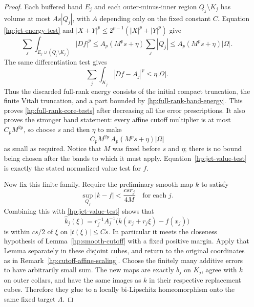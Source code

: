 \begin{proof}
Each buffered band $E_j$ and each outer-minus-inner region
$Q_j\setminus K_j$ has volume at most $A s|Q_j|$, with $A$ depending
only on the fixed constant $C$.  Equation
\eqref{hp:jet-energy-test} and
$|X+Y|^p\leq2^{p-1}(|X|^p+|Y|^p)$ give
\begin{equation}\label{hp:full-rank-band-energy}
 \sum_j\int_{E_j\cup(Q_j\setminus K_j)}|Df|^p
 \leq A_p(M^ps+\eta)\sum_j|Q_j|
 \leq A_p(M^ps+\eta)|\Omega|.
\end{equation}
The same differentiation test gives
\begin{equation}\label{hp:full-rank-core-error}
 \sum_j\int_{K_j}|Df-A_j|^p\leq\eta|\Omega|.
\end{equation}
Thus the discarded full-rank energy consists of the initial compact
truncation, the finite Vitali truncation, and a part bounded by
\eqref{hp:full-rank-band-energy}.  This proves
\eqref{hp:full-rank-core-tests} after decreasing all the error
prescriptions.  It also proves the stronger band statement: every
affine cutoff multiplier is at most $C_pM^{2p}$, so choose $s$ and
then $\eta$ to make
\[
 C_pM^{2p}\,A_p(M^ps+\eta)|\Omega|
\]
as small as required.  Notice that $M$ was fixed before $s$ and
$\eta$; there is no bound being chosen after the bands to which it
must apply.  Equation~\eqref{hp:jet-value-test} is exactly the
stated normalized value test for $f$.

Now fix this finite family.  Require the preliminary smooth map
$k$ to satisfy
\begin{equation}\label{hp:preliminary-value-test}
 \sup_{Q_j}|k-f|<\frac{csr_j}{4M}
 \quad\text{for each }j.
\end{equation}
Combining this with \eqref{hp:jet-value-test} shows that
\[
 \widehat k_j(\xi)
 =r_j^{-1}A_j^{-1}\bigl(k(x_j+r_j\xi)-f(x_j)\bigr)
\]
is within $cs/2$ of $\xi$ on $|t(\xi)|\leq Cs$.
In particular it meets the closeness hypothesis of
Lemma~\ref{hp:smooth-cutoff} with a fixed positive margin.  Apply
that Lemma separately in these disjoint cubes, and return to the
original coordinates as in
Remark~\ref{hp:cutoff-affine-scaling}.  Choose the finitely many
additive errors to have arbitrarily small sum.  The new maps are
exactly $b_j$ on $K_j$, agree with $k$ on outer collars, and have
the same images as $k$ in their respective replacement cubes.
Therefore they glue to a locally bi-Lipschitz homeomorphism onto
the same fixed target $\Lambda$.


\end{proof}
